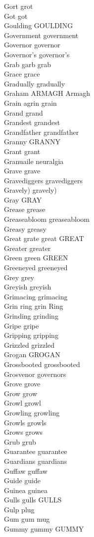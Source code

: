 Gort grot\\
Got got\\
Goulding GOULDING\\
Government government\\
Governor governor\\
Governor's governor's\\
Grab garb grab\\
Grace grace\\
Gradually gradually\\
Graham ARMAGH Armagh\\
Grain agrin grain\\
Grand grand\\
Grandest grandest\\
Grandfather grandfather\\
Granny GRANNY\\
Grant grant\\
Granuaile neuralgia\\
Grave grave\\
Gravediggers gravediggers\\
Gravely) gravely)\\
Gray GRAY\\
Grease grease\\
Greaseabloom greaseabloom\\
Greasy greasy\\
Great grate great GREAT\\
Greater greater\\
Green green GREEN\\
Greeneyed greeneyed\\
Grey grey\\
Greyish greyish\\
Grimacing grimacing\\
Grin ring grin Ring\\
Grinding grinding\\
Gripe gripe\\
Gripping gripping\\
Grizzled grizzled\\
Grogan GROGAN\\
Grossbooted grossbooted\\
Grosvenor governors\\
Grove grove\\
Grow grow\\
Growl growl\\
Growling growling\\
Growls growls\\
Grows grows\\
Grub grub\\
Guarantee guarantee\\
Guardians guardians\\
Guffaw guffaw\\
Guide guide\\
Guinea guinea\\
Gulls gulls GULLS\\
Gulp plug\\
Gum gum mug\\
Gummy gummy GUMMY\\

